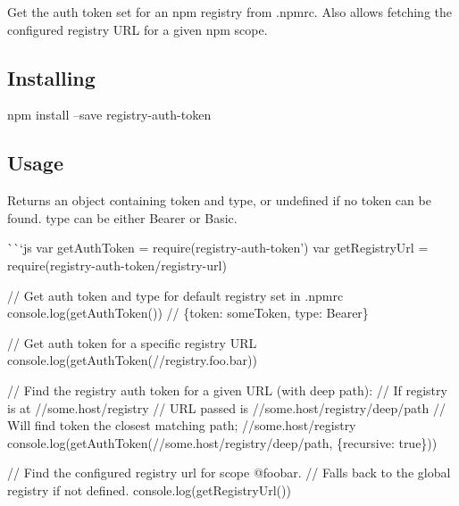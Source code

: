 \href{http://browsenpm.org/package/registry-auth-token}{\tt }\href{https://travis-ci.org/rexxars/registry-auth-token}{\tt }

Get the auth token set for an npm registry from {\ttfamily .npmrc}. Also allows fetching the configured registry U\+RL for a given npm scope.

\subsection*{Installing}


\begin{DoxyCode}
npm install --save registry-auth-token
\end{DoxyCode}


\subsection*{Usage}

Returns an object containing {\ttfamily token} and {\ttfamily type}, or {\ttfamily undefined} if no token can be found. {\ttfamily type} can be either {\ttfamily Bearer} or {\ttfamily Basic}.

\`{}\`{}`js var get\+Auth\+Token = require(\textquotesingle{}registry-\/auth-\/token') var get\+Registry\+Url = require(\textquotesingle{}registry-\/auth-\/token/registry-\/url\textquotesingle{})

// Get auth token and type for default {\ttfamily registry} set in {\ttfamily .npmrc} console.\+log(get\+Auth\+Token()) // \{token\+: \textquotesingle{}some\+Token\textquotesingle{}, type\+: \textquotesingle{}Bearer\textquotesingle{}\}

// Get auth token for a specific registry U\+RL console.\+log(get\+Auth\+Token(\textquotesingle{}//registry.foo.\+bar\textquotesingle{}))

// Find the registry auth token for a given U\+RL (with deep path)\+: // If registry is at {\ttfamily //some.host/registry} // U\+RL passed is {\ttfamily //some.host/registry/deep/path} // Will find token the closest matching path; {\ttfamily //some.host/registry} console.\+log(get\+Auth\+Token(\textquotesingle{}//some.host/registry/deep/path\textquotesingle{}, \{recursive\+: true\}))

// Find the configured registry url for scope {\ttfamily @foobar}. // Falls back to the global registry if not defined. console.\+log(get\+Registry\+Url(\textquotesingle{}\textquotesingle{}))

